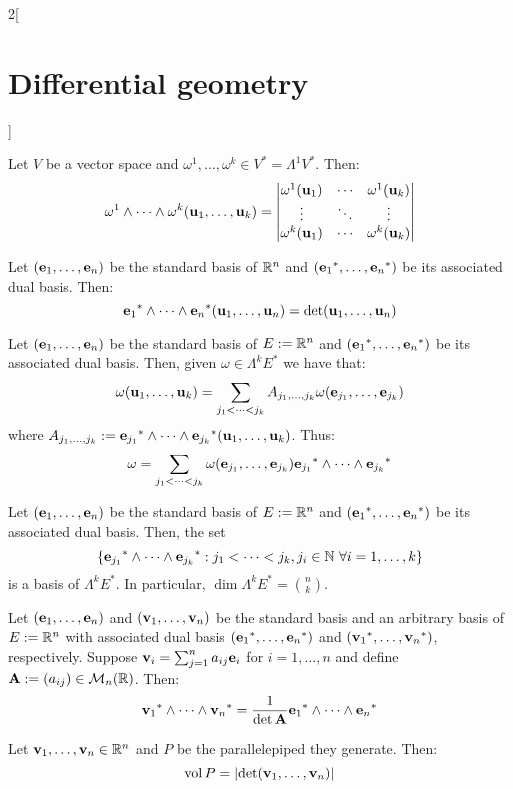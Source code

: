 \documentclass[../../../main_math.tex]{subfiles}
\begin{document}
\begin{multicols}{2}[\section{Differential geometry}]
\begin{proposition}
\begin{enumerate}
    \end{enumerate}
  \end{proposition}
  \begin{proposition}
    Let $V$ be a vector space and $\omega^1,\ldots,\omega^k\in V^*=\Lambda^1V^*$. Then: $$\omega^1\wedge\cdots\wedge\omega^k(\boldsymbol{\mathrm{u}}_1,\ldots,\boldsymbol{\mathrm{u}}_k)=
      \begin{vmatrix}
        \omega^1(\boldsymbol{\mathrm{u}}_1) & \cdots & \omega^1(\boldsymbol{\mathrm{u}}_k) \\
        \vdots             & \ddots & \vdots             \\
        \omega^k(\boldsymbol{\mathrm{u}}_1) & \cdots & \omega^k(\boldsymbol{\mathrm{u}}_k)
      \end{vmatrix}$$
  \end{proposition}
  \begin{corollary}
    Let $(\boldsymbol{\mathrm{e}}_1,\ldots,\boldsymbol{\mathrm{e}}_n)$ be the standard basis of $\mathbb{R}^n$ and $({\boldsymbol{\mathrm{e}}_1}^*,\ldots,{\boldsymbol{\mathrm{e}}_n}^*)$ be its associated dual basis. Then:
    $${\boldsymbol{\mathrm{e}}_1}^*\wedge\cdots\wedge{\boldsymbol{\mathrm{e}}_n}^*(\boldsymbol{\mathrm{u}}_1,\ldots,\boldsymbol{\mathrm{u}}_n)=\det(\boldsymbol{\mathrm{u}}_1,\ldots,\boldsymbol{\mathrm{u}}_n)$$
  \end{corollary}
  \begin{proposition}
    Let $(\boldsymbol{\mathrm{e}}_1,\ldots,\boldsymbol{\mathrm{e}}_n)$ be the standard basis of $E:=\mathbb{R}^n$ and $({\boldsymbol{\mathrm{e}}_1}^*,\ldots,{\boldsymbol{\mathrm{e}}_n}^*)$ be its associated dual basis. Then, given $\omega\in\Lambda^kE^*$ we have that: $$\omega(\boldsymbol{\mathrm{u}}_1,\ldots,\boldsymbol{\mathrm{u}}_k)=\sum_{j_1<\cdots<j_k}A_{j_1,\ldots,j_k}\omega(\boldsymbol{\mathrm{e}}_{j_1},\ldots,\boldsymbol{\mathrm{e}}_{j_k})$$
    where $A_{j_1,\ldots,j_k}:={\boldsymbol{\mathrm{e}}_{j_1}}^*\wedge\cdots\wedge{\boldsymbol{\mathrm{e}}_{j_k}}^*(\boldsymbol{\mathrm{u}}_1,\ldots,\boldsymbol{\mathrm{u}}_k)$. Thus: $$\omega=\sum_{j_1<\cdots<j_k}\omega(\boldsymbol{\mathrm{e}}_{j_1},\ldots,\boldsymbol{\mathrm{e}}_{j_k}){\boldsymbol{\mathrm{e}}_{j_1}}^*\wedge\cdots\wedge{\boldsymbol{\mathrm{e}}_{j_k}}^*$$
  \end{proposition}
  \begin{corollary}
    Let $(\boldsymbol{\mathrm{e}}_1,\ldots,\boldsymbol{\mathrm{e}}_n)$ be the standard basis of $E:=\mathbb{R}^n$ and $({\boldsymbol{\mathrm{e}}_1}^*,\ldots,{\boldsymbol{\mathrm{e}}_n}^*)$ be its associated dual basis. Then, the set $$\{{\vf{e}_{j_1}}^*\wedge\cdots\wedge{\vf{e}_{j_k}}^*:j_1<\cdots<j_k,j_i\in\NN\ \forall i=1,\ldots,k\}$$
    is a basis of $\Lambda^kE^*$. In particular, $\dim \Lambda^kE^*=\binom{n}{k}$.
  \end{corollary}
  \begin{corollary}
    Let $(\boldsymbol{\mathrm{e}}_1,\ldots,\boldsymbol{\mathrm{e}}_n)$ and $(\boldsymbol{\mathrm{v}}_1,\ldots,\boldsymbol{\mathrm{v}}_n)$ be the standard basis and an arbitrary basis of $E:=\mathbb{R}^n$ with associated dual basis $({\boldsymbol{\mathrm{e}}_1}^*,\ldots,{\boldsymbol{\mathrm{e}}_n}^*)$ and $({\boldsymbol{\mathrm{v}}_1}^*,\ldots,{\boldsymbol{\mathrm{v}}_n}^*)$, respectively. Suppose $\boldsymbol{\mathrm{v}}_i=\sum_{j=1}^na_{ij}\boldsymbol{\mathrm{e}}_i$ for $i=1,\ldots,n$ and define $\boldsymbol{\mathrm{A}}:=(a_{ij})\in\mathcal{M}_n(\mathbb{R})$. Then: $${\boldsymbol{\mathrm{v}}_1}^*\wedge\cdots\wedge{\boldsymbol{\mathrm{v}}_n}^*=\frac{1}{\det\boldsymbol{\mathrm{A}}}{\boldsymbol{\mathrm{e}}_1}^*\wedge\cdots\wedge{\boldsymbol{\mathrm{e}}_n}^*$$
  \end{corollary}
  \begin{proposition}
    Let $\boldsymbol{\mathrm{v}}_1,\ldots,\boldsymbol{\mathrm{v}}_n\in\mathbb{R}^n$ and $P$ be the parallelepiped they generate. Then:
    $$\operatorname{vol} P=\abs{\det(\boldsymbol{\mathrm{v}}_1,\ldots,\boldsymbol{\mathrm{v}}_n)}$$
  \end{proposition}

\end{multicols}
\end{document}
